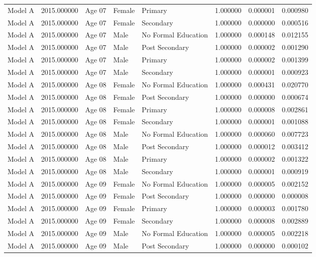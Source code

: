 \begin{table}[ht]
\begin{tabular}{lrlllrrr}
Model A & 2015.000000 & Age 07 & Female & Primary & 1.000000 & 0.000001 & 0.000980 \\
Model A & 2015.000000 & Age 07 & Female & Secondary & 1.000000 & 0.000000 & 0.000516 \\
Model A & 2015.000000 & Age 07 & Male & No Formal Education & 1.000000 & 0.000148 & 0.012155 \\
Model A & 2015.000000 & Age 07 & Male & Post Secondary & 1.000000 & 0.000002 & 0.001290 \\
Model A & 2015.000000 & Age 07 & Male & Primary & 1.000000 & 0.000002 & 0.001399 \\
Model A & 2015.000000 & Age 07 & Male & Secondary & 1.000000 & 0.000001 & 0.000923 \\
Model A & 2015.000000 & Age 08 & Female & No Formal Education & 1.000000 & 0.000431 & 0.020770 \\
Model A & 2015.000000 & Age 08 & Female & Post Secondary & 1.000000 & 0.000000 & 0.000674 \\
Model A & 2015.000000 & Age 08 & Female & Primary & 1.000000 & 0.000008 & 0.002861 \\
Model A & 2015.000000 & Age 08 & Female & Secondary & 1.000000 & 0.000001 & 0.001088 \\
Model A & 2015.000000 & Age 08 & Male & No Formal Education & 1.000000 & 0.000060 & 0.007723 \\
Model A & 2015.000000 & Age 08 & Male & Post Secondary & 1.000000 & 0.000012 & 0.003412 \\
Model A & 2015.000000 & Age 08 & Male & Primary & 1.000000 & 0.000002 & 0.001322 \\
Model A & 2015.000000 & Age 08 & Male & Secondary & 1.000000 & 0.000001 & 0.000919 \\
Model A & 2015.000000 & Age 09 & Female & No Formal Education & 1.000000 & 0.000005 & 0.002152 \\
Model A & 2015.000000 & Age 09 & Female & Post Secondary & 1.000000 & 0.000000 & 0.000008 \\
Model A & 2015.000000 & Age 09 & Female & Primary & 1.000000 & 0.000003 & 0.001780 \\
Model A & 2015.000000 & Age 09 & Female & Secondary & 1.000000 & 0.000008 & 0.002889 \\
Model A & 2015.000000 & Age 09 & Male & No Formal Education & 1.000000 & 0.000005 & 0.002218 \\
Model A & 2015.000000 & Age 09 & Male & Post Secondary & 1.000000 & 0.000000 & 0.000102 \\

\end{tabular}
\end{table}
